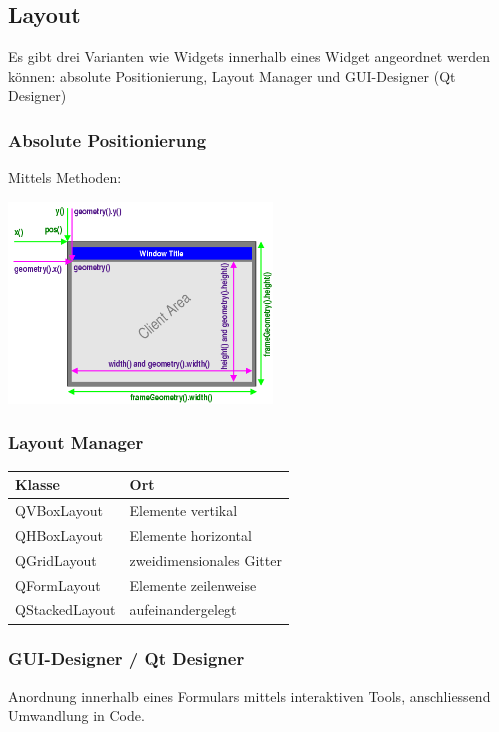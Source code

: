 \subsection{Layout}
Es gibt drei Varianten wie Widgets innerhalb eines Widget angeordnet werden können: \newline
absolute Positionierung, Layout Manager und GUI-Designer (Qt Designer)

\subsubsection{Absolute Positionierung}
Mittels Methoden:
\begin{multicols}{2}	
	
	
	\includegraphics[width=7cm]{images/geometry.png}
\end{multicols}

\subsubsection{Layout Manager} %
	\begin{tabular}{|l|l|}
		\hline \textbf{Klasse} & \textbf{Ort}\\
		\hline QVBoxLayout & Elemente vertikal\\
		\hline QHBoxLayout & Elemente horizontal\\
		\hline QGridLayout & zweidimensionales Gitter\\
		\hline QFormLayout & Elemente zeilenweise\\
		\hline QStackedLayout & aufeinandergelegt\\
		\hline
	\end{tabular}
	
\subsubsection{GUI-Designer / Qt Designer}	
	Anordnung innerhalb eines Formulars mittels interaktiven Tools, anschliessend Umwandlung in Code. 	


